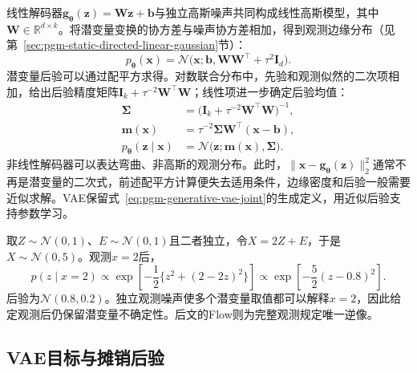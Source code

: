 线性解码器$\bm{g}_{\bm{\theta}}(\bm{z})=\bm{W}\bm{z}+\bm{b}$与独立高斯噪声共同构成线性高斯模型，其中$\bm{W}\in\mathbb{R}^{d\times k}$。将潜变量变换的协方差与噪声协方差相加，得到观测边缘分布（见第~\ref{sec:pgm-static-directed-linear-gaussian}节）：
\[
  p_{\bm{\theta}}(\bm{x})
  =\mathcal{N}\bigl(\bm{x};
    \bm{b},\bm{W}\bm{W}^{\top}+\tau^2\bm{I}_d\bigr).
\]
潜变量后验可以通过配平方求得。对数联合分布中，先验和观测似然的二次项相加，给出后验精度矩阵$\bm{I}_k+\tau^{-2}\bm{W}^{\top}\bm{W}$；线性项进一步确定后验均值：
\begin{equation}
  \label{eq:pgm-generative-linear-posterior}
  \begin{aligned}
    \bm{\Sigma}
      &=\bigl(\bm{I}_k+\tau^{-2}\bm{W}^{\top}\bm{W}\bigr)^{-1},\\
    \bm{m}(\bm{x})
      &=\tau^{-2}\bm{\Sigma}\bm{W}^{\top}(\bm{x}-\bm{b}),\\
    p_{\bm{\theta}}(\bm{z}\mid\bm{x})
      &=\mathcal{N}\bigl(\bm{z};\bm{m}(\bm{x}),\bm{\Sigma}\bigr).
  \end{aligned}
\end{equation}
非线性解码器可以表达弯曲、非高斯的观测分布。此时，$\lVert\bm{x}-\bm{g}_{\bm{\theta}}(\bm{z})\rVert_2^2$通常不再是潜变量的二次式，前述配平方计算便失去适用条件，边缘密度和后验一般需要近似求解。VAE保留式~\eqref{eq:pgm-generative-vae-joint}的生成定义，用近似后验支持参数学习。

\begin{example}[同一观测分布的潜变量解释]
  \label{ex:pgm-generative-gaussian-latent}
  取$Z\sim\mathcal{N}(0,1)$、$E\sim\mathcal{N}(0,1)$且二者独立，令$X=2Z+E$，于是$X\sim\mathcal{N}(0,5)$。观测$x=2$后，
  \[
    p(z\mid x=2)\propto
    \exp\left[-\frac{1}{2}\{z^2+(2-2z)^2\}\right]
    \propto\exp\left[-\frac{5}{2}(z-0.8)^2\right].
  \]
  后验为$\mathcal{N}(0.8,0.2)$。独立观测噪声使多个潜变量取值都可以解释$x=2$，因此给定观测后仍保留潜变量不确定性。后文的Flow则为完整观测规定唯一逆像。
\end{example}

\subsection{VAE目标与摊销后验}
\label{sec:pgm-generative-vae-objective}

